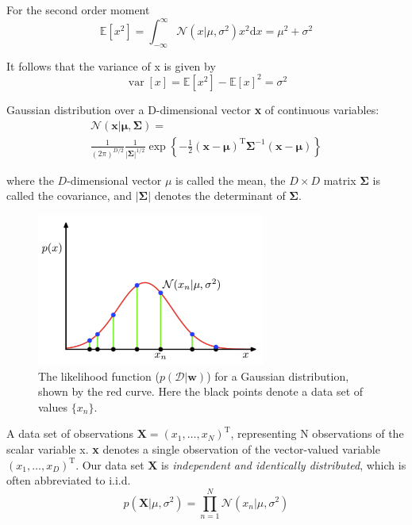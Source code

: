 \documentclass[5p,sort&compress]{elsarticle}
\begin{document}
For the second order moment
\begin{equation}
\mathbb{E}\left[x^{2}\right]=\int_{-\infty}^{\infty} \mathcal{N}\left(x | \mu, \sigma^{2}\right) x^{2} \mathrm{d} x=\mu^{2}+\sigma^{2}
\end{equation}

It follows that the variance of x is given by
\begin{equation}
\operatorname{var}[x]=\mathbb{E}\left[x^{2}\right]-\mathbb{E}[x]^{2}=\sigma^{2}
\end{equation}

Gaussian distribution over a D-dimensional vector \textbf{x} of continuous variables:
\begin{equation}
\begin{aligned}\mathcal{N}(\mathbf{x} | \boldsymbol{\mu}, \mathbf{\Sigma})= \\
\frac{1}{(2 \pi)^{D / 2}} \frac{1}{|\mathbf{\Sigma}|^{1 / 2}} \exp \left\{-\frac{1}{2}(\mathbf{x}-\boldsymbol{\mu})^{\mathrm{T}} \mathbf{\Sigma}^{-1}(\mathbf{x}-\boldsymbol{\mu})\right\}\end{aligned}
\end{equation}

where the $D$-dimensional vector $\mu$ is called the mean, the $D \times D$ matrix $\mathbf{\Sigma}$ is called the covariance, and $|\mathbf{\Sigma}|$ denotes the determinant of $\mathbf{\Sigma}$.

\begin{figure}[h]
    \centering
    \includegraphics[width=7.5cm]{figure/gaussian.png}
    \caption{The likelihood function ($p(\mathcal{D}|\textbf{w})$) for a Gaussian distribution, shown by the red curve. Here the black points denote a data set of values $\{x_n\}$.}
    \label{fig:1.13}
\end{figure}

A data set of observations $\mathbf{X}=\left(x_{1}, \ldots, x_{N}\right)^{\mathrm{T}}$, representing N observations of the scalar variable x. \textbf{x} denotes a single observation of the vector-valued variable $\left(x_{1}, \ldots, x_{D}\right)^{\mathrm{T}}$. Our data set $\mathbf{X}$ is \textit{independent and identically distributed}, which is often abbreviated to i.i.d. 
\begin{equation}
p\left(\mathbf{X} | \mu, \sigma^{2}\right)=\prod_{n=1}^{N} \mathcal{N}\left(x_{n} | \mu, \sigma^{2}\right)
\end{equation}
\end{document}
